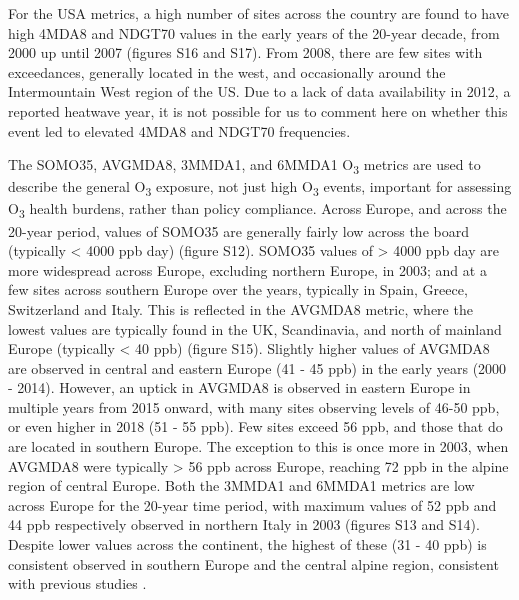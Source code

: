 \documentclass[journal abbreviation, manuscript]{copernicus}
\begin{document}
For the USA metrics, a high number of sites across the country are found to have high 4MDA8 and NDGT70 values in the early years of the 20-year decade, from 2000 up until 2007 (figures S16 and S17). From 2008, there are few sites with exceedances, generally located in the west, and occasionally around the Intermountain West region of the US. Due to a lack of data availability in 2012, a reported heatwave year, it is not possible for us to comment here on whether this event led to elevated 4MDA8 and NDGT70 frequencies. 

The SOMO35, AVGMDA8, 3MMDA1, and 6MMDA1 O\textsubscript{3} metrics are used to describe the general O\textsubscript{3} exposure, not just high O\textsubscript{3} events, important for assessing O\textsubscript{3} health burdens, rather than policy compliance. Across Europe, and across the 20-year period, values of SOMO35 are generally fairly low across the board (typically < 4000 ppb day) (figure S12). SOMO35 values of > 4000 ppb day are more widespread across Europe, excluding northern Europe, in 2003; and at a few sites across southern Europe over the years, typically in Spain, Greece, Switzerland and Italy. This is reflected in the AVGMDA8 metric, where the lowest values are typically found in the UK, Scandinavia, and north of mainland Europe (typically < 40 ppb) (figure S15). Slightly higher values of AVGMDA8 are observed in central and eastern Europe (41 - 45 ppb) in the early years (2000 - 2014). However, an uptick in AVGMDA8 is observed in eastern Europe in multiple years from 2015 onward, with many sites observing levels of 46-50 ppb, or even higher in 2018 (51 - 55 ppb). Few sites exceed 56 ppb, and those that do are located in southern Europe. The exception to this is once more in 2003, when AVGMDA8 were typically > 56 ppb across Europe, reaching 72 ppb in the alpine region of central Europe. Both the 3MMDA1 and 6MMDA1 metrics are low across Europe for the 20-year time period, with maximum values of 52 ppb and 44 ppb respectively observed in northern Italy in 2003 (figures S13 and S14). Despite lower values across the continent, the highest of these (31 - 40 ppb) is consistent observed in southern Europe and the central alpine region, consistent with previous studies \citep{WangKeding2024}.
\end{document}
